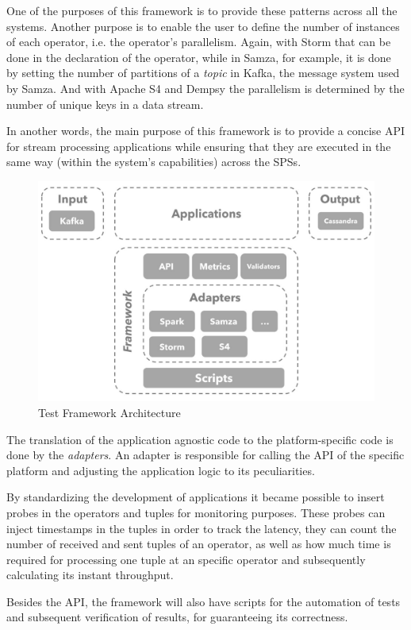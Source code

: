 \documentclass[ppgc,diss,english]{iiufrgs}
\begin{document}
One of the purposes of this framework is to provide these patterns across all the systems. Another purpose is to enable the user to define the number of instances of each operator, i.e. the operator's parallelism. Again, with Storm that can be done in the declaration of the operator, while in Samza, for example, it is done by setting the number of partitions of a \textit{topic} in Kafka, the message system used by Samza. And with Apache S4 and Dempsy the parallelism is determined by the number of unique keys in a data stream.

In another words, the main purpose of this framework is to provide a concise API for stream processing applications while ensuring that they are executed in the same way (within the system's capabilities) across the SPSs.

\begin{figure}[ht!]
	\centering
	\includegraphics[width=.8\textwidth]{images/architecture.jpg}
	\caption{Test Framework Architecture}
	\label{fig:framework_architecture}
\end{figure}

The translation of the application agnostic code to the platform-specific code is done by the \textit{adapters}. An adapter is responsible for calling the API of the specific platform and adjusting the application logic to its peculiarities.

By standardizing the development of applications it became possible to insert probes in the operators and tuples for monitoring purposes. These probes can inject timestamps in the tuples in order to track the latency, they can count the number of received and sent tuples of an operator, as well as how much time is required for processing one tuple at an specific operator and subsequently calculating its instant throughput.

Besides the API, the framework will also have scripts for the automation of tests and subsequent verification of results, for guaranteeing its correctness.
\end{document}
